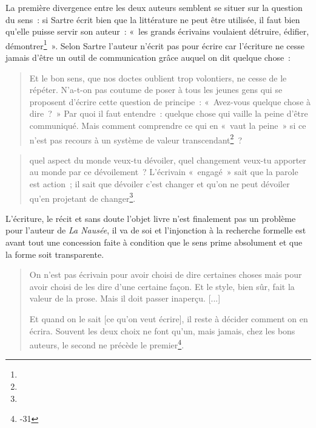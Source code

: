 \documentclass[12pt, a4paper]{article}
\begin{document}
La première divergence entre les deux auteurs semblent se situer sur la question du sens~: si Sartre écrit bien que la littérature ne peut être utilisée, il faut bien qu'elle puisse servir son auteur~: «~les grands écrivains voulaient détruire, édifier, démontrer\footnote{}~». Selon Sartre l'auteur n'écrit pas pour écrire car l'écriture ne cesse jamais d'être un outil de communication grâce auquel on dit quelque chose~:
 \begin{quote}
        Et le bon sens, que nos doctes oublient trop volontiers, ne cesse de le répéter. N'a-t-on pas coutume de poser à tous les jeunes gens qui se proposent d'écrire cette question de principe~: «~Avez-vous quelque chose à dire~?~» Par quoi il faut entendre~: quelque chose qui vaille la peine d'être communiqué. Mais comment comprendre ce qui en «~vaut la peine~» si ce n'est pas recours à un système de valeur transcendant\footnote{}~? 
    \end{quote}
    \begin{quote}
        quel aspect du monde veux-tu dévoiler, quel changement veux-tu apporter au monde par ce dévoilement~? L'écrivain «~engagé~» sait que la parole est action~; il sait que dévoiler c'est changer et qu'on ne peut dévoiler qu'en projetant de changer\footnote{}.
    \end{quote}
    
L'écriture, le récit et sans doute l'objet livre n'est finalement pas un problème pour l'auteur de \textit{La Nausée}, il va de soi et l'injonction à la recherche formelle est avant tout une concession faite à condition que le sens prime absolument et que la forme soit transparente.
\begin{quote}
    On n'est pas écrivain pour avoir choisi de dire certaines choses mais pour avoir choisi de les dire d'une certaine façon. Et le style, bien sûr, fait la valeur de la prose. Mais il doit passer inaperçu. [...]

    Et quand on le sait [ce qu'on veut écrire], il reste à décider comment on en écrira. Souvent les deux choix ne font qu'un, mais jamais, chez les bons auteurs, le second ne précède le premier\footnote{-31}.
\end{quote}

   
\end{document}
